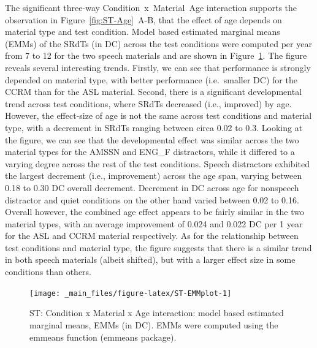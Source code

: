 \documentclass[a4paper, twoside]{templates/ociamthesis}
\begin{document}
The significant three-way Condition~x~Material~Age interaction supports the observation in Figure~\ref{fig:ST-Age}~A-B, that the effect of age depends on material type and test condition. Model based estimated marginal means (EMMs) of the SRdTs (in DC) across the test conditions were computed per year from 7 to 12 for the two speech materials and are shown in Figure~\ref{fig:ST-EMMplot}. The figure reveals several interesting trends. Firstly, we can see that performance is strongly depended on material type, with better performance (i.e.~smaller DC) for the CCRM than for the ASL material. Second, there is a significant developmental trend across test conditions, where SRdTs decreased (i.e., improved) by age. However, the effect-size of age is not the same across test conditions and material type, with a decrement in SRdTs ranging between circa 0.02 to 0.3. Looking at the figure, we can see that the developmental effect was similar across the two material types for the AMSSN and ENG\_F distractors, while it differed to a varying degree across the rest of the test conditions. Speech distractors exhibited the largest decrement (i.e., improvement) across the age span, varying between 0.18 to 0.30 DC overall decrement. Decrement in DC across age for nonspeech distractor and quiet conditions on the other hand varied between 0.02 to 0.16. Overall however, the combined age effect appears to be fairly similar in the two material types, with an average improvement of 0.024 and 0.022 DC per 1 year for the ASL and CCRM material respectively. As for the relationship between test conditions and material type, the figure suggests that there is a similar trend in both speech materials (albeit shifted), but with a larger effect size in some conditions than others.\\

\begin{figure}

{\centering \texttt{[image: \_main\_files/figure-latex/ST-EMMplot-1]} 

}

\caption{ST: Condition x Material x Age interaction: model based estimated marginal means, EMMs (in DC). EMMs were computed using the emmeans function (emmeans package).}\label{fig:ST-EMMplot}
\end{figure}
\end{document}
